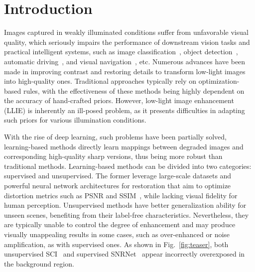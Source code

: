
\section{Introduction}\label{sec:introduction}
Images captured in weakly illuminated conditions suffer from unfavorable visual quality, which seriously impairs the performance of downstream vision tasks and practical intelligent systems, such as image classification~\cite{Classification}, object detection~\cite{Facedetection}, automatic driving~\cite{autonomousdriving}, and visual navigation~\cite{VisualNavigation}, etc. Numerous advances have been made in improving contrast and restoring details to transform low-light images into high-quality ones. Traditional approaches typically rely on optimization-based rules, with the effectiveness of these methods being highly dependent on the accuracy of hand-crafted priors. However, low-light image enhancement (LLIE) is inherently an ill-posed problem, as it presents difficulties in adapting such priors for various illumination conditions. 

With the rise of deep learning, such problems have been partially solved, learning-based methods directly learn mappings between degraded images and corresponding high-quality sharp versions, thus being more robust than traditional methods. Learning-based methods can be divided into two categories: supervised and unsupervised. The former leverage large-scale datasets and powerful neural network architectures for restoration that aim to optimize distortion metrics such as PSNR and SSIM~\cite{SSIM}, while lacking visual fidelity for human perception. Unsupervised methods have better generalization ability for unseen scenes, benefiting from their label-free characteristics. Nevertheless, they are typically unable to control the degree of enhancement and may produce visually unappealing results in some cases, such as over-enhanced or noise amplification, as with supervised ones. As shown in Fig.~\ref{fig:teaser}, both unsupervised SCI~\cite{SCI} and supervised SNRNet~\cite{SNRNet} appear incorrectly overexposed in the background region.


